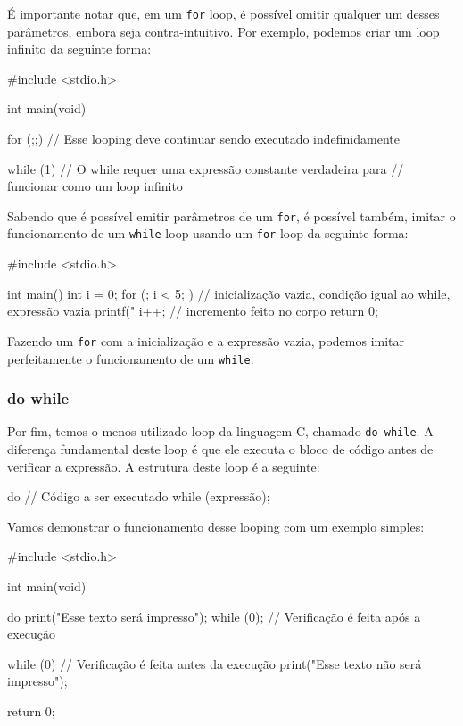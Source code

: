 É importante notar que, em um \texttt{for} loop, é possível omitir qualquer 
um desses parâmetros, embora seja contra-intuitivo. Por exemplo, podemos criar 
um loop infinito da seguinte forma:

\begin{excode}
    #include <stdio.h>

    int main(void)
    {
        for (;;) {
            // Esse looping deve continuar sendo executado indefinidamente 
        }

        while (1) {
            // O while requer uma expressão constante verdadeira para 
            // funcionar como um loop infinito
        }
    }
\end{excode}

Sabendo que é possível emitir parâmetros de um \texttt{for}, é possível 
também, imitar o funcionamento de um \texttt{while} loop usando um 
\texttt{for} loop da seguinte forma:

\begin{excode}
    #include <stdio.h>

    int main() {
        int i = 0;
        for (; i < 5; ) { // inicialização vazia, condição igual ao while, expressão vazia
            printf("%
            i++; // incremento feito no corpo
        }
        return 0;
    }
\end{excode}

Fazendo um \texttt{for} com a inicialização e a expressão vazia, podemos 
imitar perfeitamente o funcionamento de um \texttt{while}.

\subsubsection{do while}

Por fim, temos o menos utilizado loop da linguagem C, chamado 
\texttt{do while}. A diferença fundamental deste loop é que ele executa o 
bloco de código antes de verificar a expressão. A estrutura deste loop é a 
seguinte:

\begin{excode}
    do {
        // Código a ser executado
    } while (expressão);
\end{excode}

Vamos demonstrar o funcionamento desse looping com um exemplo simples:

\newpage
\begin{excode}
    #include <stdio.h>

    int main(void)
    {
        do {
            print("Esse texto será impresso\n");
        } while (0); // Verificação é feita após a execução

        while (0) { // Verificação é feita antes da execução
            print("Esse texto não será impresso\n");
        }

        return 0;
    }
\end{excode}

